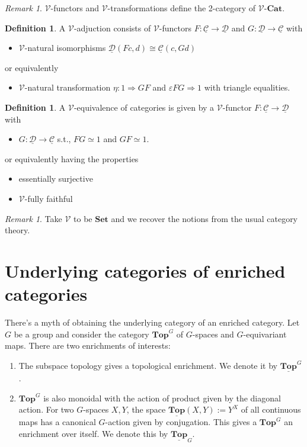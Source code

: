 \documentclass[11pt]{article}
\theoremstyle{definition}
\newtheorem{definition}[theorem]{Definition}
\theoremstyle{remark}
\newtheorem{remark}[theorem]{Remark}
\newcommand{\Top}{\mathbf{Top}}
\newcommand{\ucalC}{\underline{\mathcal{C}}}
\newcommand{\ucalD}{\underline{\mathcal{D}}}
\newcommand{\calV}{\mathcal{V}}
\newcommand{\bfset}{\mathbf{Set}}
\begin{document}
\begin{remark}
    $\calV$-functors and $\calV$-transformations define the 2-category of $\calV$-$\textbf{Cat}$.
\end{remark}

\begin{definition}
    A $\calV$-adjuction consists of $\calV$-functors $F : \ucalC \to \ucalD$ and $G : \ucalD \to \ucalC$ with
    \begin{itemize}
        \item $\calV$-natural isomorphisms $\ucalD(Fc,d) \cong \ucalC(c,Gd)$
    \end{itemize}
    or equivalently
    \begin{itemize}
        \item $\calV$-natural transformation $\eta : 1 \Rightarrow GF$ and $\varepsilon FG \Rightarrow 1$ with
            triangle equalities.
    \end{itemize}
\end{definition}

\begin{definition}
    A $\calV$-equivalence of categories is given by a $\calV$-functor $F : \ucalC \to \ucalD$ with
    \begin{itemize}
        \item $G : \ucalD \to \ucalC$ s.t., $FG \simeq 1$ and $GF \simeq 1$.
    \end{itemize}
    or equivalently having the properties
    \begin{itemize}
        \item essentially surjective
        \item $\calV$-fully faithful
    \end{itemize}
\end{definition}

\begin{remark}
    Take $\calV$ to be $\bfset$ and we recover the notions from the usual category theory.
\end{remark}

\section{Underlying categories of enriched categories}
There's a myth of obtaining the underlying category of an enriched category.
Let $G$ be a group and consider the category $\Top^G$ of $G$-spaces and $G$-equivariant maps.
There are two enrichments of interests:
\begin{enumerate}
    \item The subspace topology gives a topological enrichment. We denote it by $\underline{\Top}^G$.
    \item $\Top^G$ is also monoidal with the action of product given by the diagonal action.
        For two $G$-spaces $X,Y$, the space $\underline{\Top}(X,Y) := Y^X$ of all continuous maps
        has a canonical $G$-action given by conjugation. This gives a $\Top^G$ an enrichment over itself.
        We denote this by $\underline{\Top}_G$.
\end{enumerate}
\end{document}
